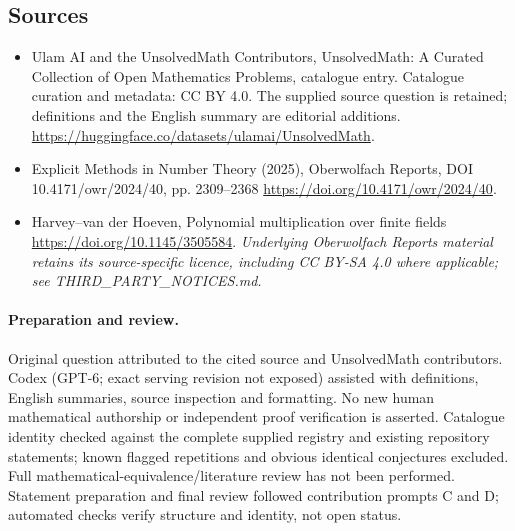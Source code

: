 \documentclass[11pt]{article}
\begin{document}
\subsection{Sources}
\begin{itemize}
\item[\hypertarget{source:statement:1}{S1}] Ulam AI and the UnsolvedMath Contributors, UnsolvedMath: A Curated Collection of Open Mathematics Problems, catalogue entry. Catalogue curation and metadata: CC BY 4.0. The supplied source question is retained; definitions and the English summary are editorial additions.
\url{https://huggingface.co/datasets/ulamai/UnsolvedMath}.
\item[\hypertarget{source:statement:2}{S2}] Explicit Methods in Number Theory (2025), Oberwolfach Reports, DOI 10.4171/owr/2024/40, pp. 2309--2368
\url{https://doi.org/10.4171/owr/2024/40}.
\item[\hypertarget{source:statement:3}{S3}] Harvey--van der Hoeven, Polynomial multiplication over finite fields
\url{https://doi.org/10.1145/3505584}.
\textit{Underlying Oberwolfach Reports material retains its source-specific licence, including CC BY-SA 4.0 where applicable; see THIRD\_PARTY\_NOTICES.md.}
\end{itemize}
\paragraph{Preparation and review.}
Original question attributed to the cited source and UnsolvedMath contributors. Codex (GPT-6; exact serving revision not exposed) assisted with definitions, English summaries, source inspection and formatting. No new human mathematical authorship or independent proof verification is asserted. Catalogue identity checked against the complete supplied registry and existing repository statements; known flagged repetitions and obvious identical conjectures excluded. Full mathematical-equivalence/literature review has not been performed. Statement preparation and final review followed contribution prompts C and D; automated checks verify structure and identity, not open status.
\label{end:statement}
\end{document}
